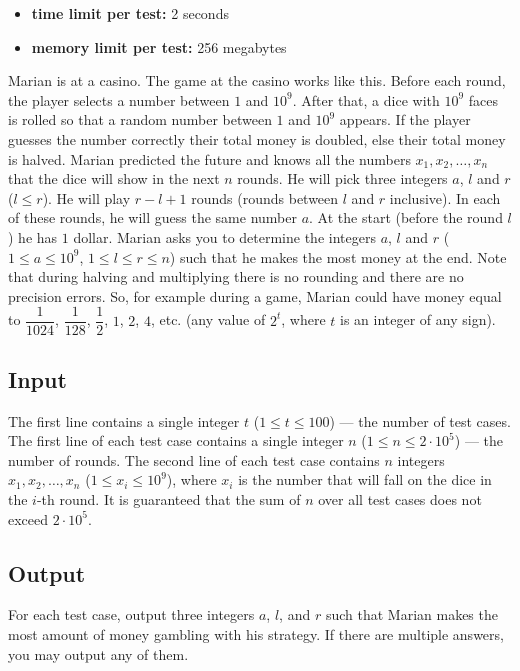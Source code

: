 \documentclass{article}
\begin{document}
\begin{itemize}
\item \textbf{time limit per test:} 2 seconds
\item \textbf{memory limit per test:} 256 megabytes
\end{itemize}
Marian is at a casino. The game at the casino works like this. Before each round, the player selects a number between $1$ and $10^9$. After that, a dice with $10^9$ faces is rolled so that a random number between $1$ and $10^9$ appears. If the player guesses the number correctly their total money is doubled, else their total money is halved. Marian predicted the future and knows all the numbers $x_1, x_2, \dots, x_n$ that the dice will show in the next $n$ rounds. He will pick three integers $a$, $l$ and $r$ ($l \leq r$). He will play $r-l+1$ rounds (rounds between $l$ and $r$ inclusive). In each of these rounds, he will guess the same number $a$. At the start (before the round $l$) he has $1$ dollar. Marian asks you to determine the integers $a$, $l$ and $r$ ($1 \leq a \leq 10^9$, $1 \leq l \leq r \leq n$) such that he makes the most money at the end. Note that during halving and multiplying there is no rounding and there are no precision errors. So, for example during a game, Marian could have money equal to $\dfrac{1}{1024}$, $\dfrac{1}{128}$, $\dfrac{1}{2}$, $1$, $2$, $4$, etc. (any value of $2^t$, where $t$ is an integer of any sign).

\subsection*{Input}
 The first line contains a single integer $t$ ($1 \leq t \leq 100$) — the number of test cases. The first line of each test case contains a single integer $n$ ($1 \leq n \leq 2\cdot 10^5$) — the number of rounds. The second line of each test case contains $n$ integers $x_1, x_2, \dots, x_n$ ($1 \leq x_i \leq 10^9$), where $x_i$ is the number that will fall on the dice in the $i$-th round. It is guaranteed that the sum of $n$ over all test cases does not exceed $2\cdot10^5$.

\subsection*{Output}
 For each test case, output three integers $a$, $l$, and $r$ such that Marian makes the most amount of money gambling with his strategy. If there are multiple answers, you may output any of them.
\end{document}
